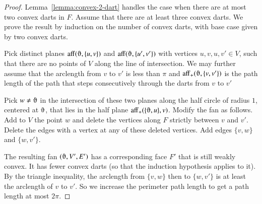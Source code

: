 \begin{proof}  Lemma~\ref{lemma:convex-2-dart} handles the case
when there are at most two convex darts in $F$.
Assume that there are at least three convex darts.
We prove the result by induction on the number of convex darts, with base case given by two convex darts.

Pick distinct planes $\op{aff}(\orgn,\{u,v\})$ and $\op{aff}(\orgn,\{u',v'\})$ with vertices $u,v,u,v'\in V$, such that there are no points of
$V$ along the line of intersection.  We may further assume that 
the arclength from $v$ to $v'$ is less than $\pi$ and
$\op{aff}_+(\orgn,\{v,v'\})$ is the path length of the path that
steps consecutively through the darts from $v$ to $v'$

Pick $w\ne \orgn$ in the intersection of these two planes along
the half circle of radius $1$, centered at $\orgn$, that lies
in the half plane $\op{aff}_+(\{\orgn,u\},v)$.  Modify the fan
as follows. Add to $V$ the point $w$ and delete the vertices along
$F$ strictly between $v$ and $v'$.  Delete the edges with a vertex
at any of these deleted vertices.  Add edges $\{v,w\}$ and $\{w,v'\}$.

The resulting fan $(\orgn,V',E')$ has a corresponding face $F'$ that is
still weakly convex.  It has fewer convex darts (so that the induction
hypothesis applies to it).  By the triangle inequality, the
arclength from $\{v,w\}$ then to $\{w,v'\}$ is at least the arclength
of $v$ to $v'$.  So we increase the perimeter path length to get
a path length at most $2\pi$.
\end{proof}

%
%
%


